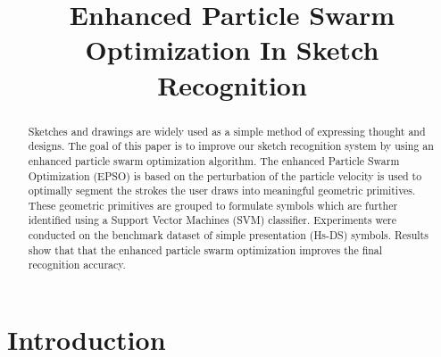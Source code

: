 \documentclass[10pt]{article}
\title{Enhanced Particle Swarm Optimization In Sketch Recognition}
\begin{document}
\maketitle
 \begin{abstract}

Sketches and drawings are widely used as a simple method of expressing thought and designs. The goal of this paper is to improve our sketch recognition system by using an enhanced particle swarm optimization algorithm. The enhanced Particle Swarm Optimization (EPSO) is based on the perturbation of the particle velocity is used to optimally segment the strokes the user draws into meaningful geometric primitives.  These geometric primitives are grouped to formulate symbols which are further identified using a Support Vector Machines (SVM) classifier. Experiments were conducted on the benchmark dataset of simple presentation (Hs-DS) symbols. Results show that that the enhanced particle swarm optimization improves the final recognition accuracy. 
\end{abstract}
 \section{Introduction}
\end{document}
